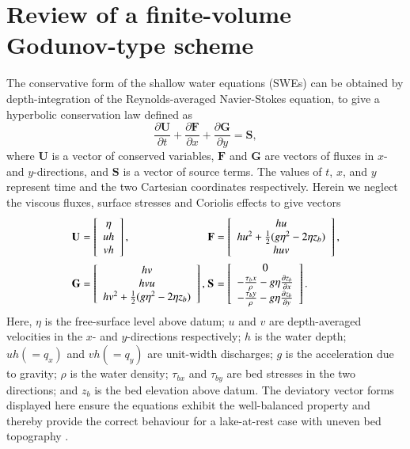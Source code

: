 \documentclass[11pt,english,a4paper]{article}
\begin{document}
\section{Review of a finite-volume Godunov-type scheme}

The conservative form of the shallow water equations (SWEs) can be obtained by depth-integration of the Reynolds-averaged Navier-Stokes equation, to give a hyperbolic conservation law defined as
\begin{equation}
	\label{SWE}
	\frac{\partial\textbf{U}}{\partial t} +
	\frac{\partial\textbf{F}}{\partial x} +
	\frac{\partial\textbf{G}}{\partial y} =
	\textbf{S} ,
\end{equation}
where \(\textbf{U}\) is a vector of conserved variables, \(\textbf{F}\) and \(\textbf{G}\) are vectors of fluxes in \(x\)- and \(y\)-directions, and \(\textbf{S}\) is a vector of source terms. The values of \(t\), \(x\), and \(y\) represent time and the two Cartesian coordinates respectively. Herein we neglect the viscous fluxes, surface stresses and Coriolis effects to give vectors
\renewcommand{\arraystretch}{1.5}
\begin{equation}
	\label{SWETerms}
	\begin{alignedat}{4}
		&\textbf U && = \left[ \begin{array}{c}
			\eta \\
			uh \\
			vh
		\end{array} \right] , ~ &&
		\textbf F &&  = \left[ \begin{array}{c}
			hu \\
			hu^2 + \frac{1}{2}(g\eta^2 - 2\eta z_b) \\
			huv
		\end{array} \right] ,\\
		&\textbf G && = \left[ \begin{array}{c}
			hv \\
			hvu \\
			hv^2 + \frac{1}{2}(g\eta^2 - 2\eta z_b) \\
		\end{array} \right] , ~ &&
		\textbf S && = \left[ \begin{array}{c}
			0 \\
			-\frac{\tau_bx}{\rho} - g\eta \frac{\partial z_b}{\partial x} \\
			-\frac{\tau_by}{\rho} - g\eta \frac{\partial z_b}{\partial y} \\
		\end{array} \right] .
	\end{alignedat}
\end{equation}
Here, \(\eta\) is the free-surface level above datum; \(u\) and \(v\) are depth-averaged velocities in the \(x\)- and \(y\)-directions respectively; \(h\) is the water depth; \(uh (=q_x)\) and \(vh (=q_y)\) are unit-width discharges; \(g\) is the acceleration due to gravity; \(\rho\) is the water density; \(\tau_{bx}\) and \(\tau_{by}\) are bed stresses in the two directions; and \(z_b\) is the bed elevation above datum. The deviatory vector forms displayed here ensure the equations exhibit the well-balanced property and thereby provide the correct behaviour for a lake-at-rest case with uneven bed topography \cite{Liang_09}.
\end{document}
